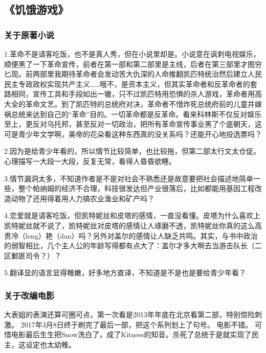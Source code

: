 \subsection{《饥饿游戏》}
\subsubsection{关于原著小说}

1.革命不是请客吃饭，也不是真人秀，但在小说里却是。小说意在讽刺电视娱乐，顺便黑了一下革命宣传，前者在第一部和第二部里是主线，后者在第三部里才图穷匕现。前两部里我期待革命者会发动苦大仇深的人命推翻凯匹特统治然后建立人民民主专政政权实现共产主义……哦不，是资本主义，但其实革命者和反革命者的套路相同，宣传工具和手段如出一辙，只不过凯匹特用恐惧的杀人游戏，革命者用高大全的革命文艺。到了凯匹特的总统府对决，革命者不惜炸死总统府前的儿童并嫁祸总统来达到自己的“革命”目的。一切革命都是反革命。看来科林斯不仅反对娱乐至上，更反对乌托邦，甚至反对一切政治，把所有革命宣传事业黑了个底朝天，这可是青少年文学啊，美帝的花朵看这种东西真的没关系吗？还能开心地投选票吗？

2.因为是给青少年看的，所以情节比较简单，也比较拖，但第二部太行文太仓促。心理描写一大段一大段，反复无常，看得人昏昏欲睡。

3.情节漏洞太多，不知道作者是不是对社会不熟悉还是故意要把社会描述地简单一些，整个帕纳姆的经济不合理，科技很发达但产业很落后，比如都能用基因工程改造动物了还用得着用人力搞农业渔业和矿产吗？

4.恋爱就是请客吃饭，但凯特妮丝和皮塔的感情，一直没看懂。皮塔为什么喜欢上凯特妮丝就不说了，凯特妮丝对皮塔的感情让人琢磨不透，凯特妮丝你真的这么高贵冷（leng）艳（dan）吗？另外对盖尔的感情让人缺乏共鸣。其实，与书中政治的弱智相比，几个主人公的年龄写得都有点大了：盖尔才多大啊去当游击队长（二区鄛匪司令？）？

5.翻译显的语言显得稚嫩，好多地方直译，不知道是不是也是要给青少年看？

\subsubsection{关于改编电影}

大表姐的表演还算可圈可点，第一次看是2013年年底在北京看第二部，特别惊险刺激。 
2017年3月8日终于刷完了最后一部，把这个系列划上了句号。 
电影不错。 
可惜电影最后生生把Snow洗白了，成了Kitness的知音。杀死了总统于是就实现了民主，这设定也太幼稚。